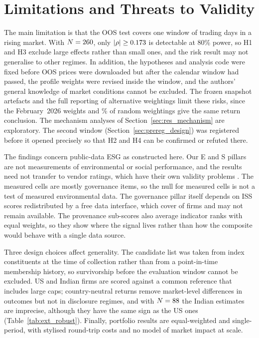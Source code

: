 \section{Limitations and Threats to Validity}
\label{sec:limitations}

The main limitation is that the OOS test covers one window of \TradingDaysUS
trading days in a rising market. With $N=260$, only $|\rho|\ge0.173$ is
detectable at 80\% power, so H1 and H3 exclude large effects rather than
small ones, and the risk result may not generalise to other regimes. In
addition, the hypotheses and analysis code were fixed before OOS prices were
downloaded but after the calendar window had passed, the profile weights
were revised inside the window, and the authors' general knowledge of market
conditions cannot be excluded. The frozen snapshot artefacts and the full
reporting of alternative weightings limit these risks, since the
February~2026 weights and \WShareNeg\% of random weightings give the same
return conclusion. The mechanism analyses of Section~\ref{sec:res_mechanism}
are exploratory. The second window (Section~\ref{sec:prereg_design}) was
registered before it opened precisely so that H2 and H4 can be confirmed or
refuted there.

The findings concern public-data ESG as constructed here. Our E and S
pillars are not measurements of environmental or social performance, and the
results need not transfer to vendor ratings, which have their own validity
problems \cite{berg_2022, christensen_2022}. The measured cells are mostly
governance items, so the null for measured cells is not a test of measured
environmental data. The governance pillar itself depends on ISS scores
redistributed by a free data interface, which cover \NISSFirms of \NMid
firms and may not remain available. The provenance sub-scores also average
indicator ranks with equal weights, so they show where the signal lives
rather than how the composite would behave with a single data source.

Three design choices affect generality. The candidate list was taken from
index constituents at the time of collection rather than from a
point-in-time membership history, so survivorship before the evaluation
window cannot be excluded. US and Indian firms are scored against a common
reference that includes \NLarge large caps; country-neutral returns remove
market-level differences in outcomes but not in disclosure regimes, and with
$N=88$ the Indian estimates are imprecise, although they have the same
sign as the US ones (Table~\ref{tab:ext_robust}). Finally, portfolio results
are equal-weighted and single-period, with stylised round-trip costs and no
model of market impact at scale.
